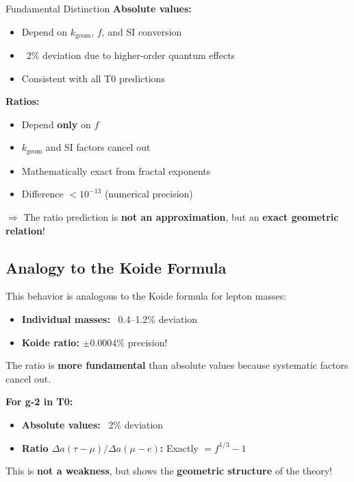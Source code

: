 	\begin{important}{Fundamental Distinction}
		\textbf{Absolute values:}
		\begin{itemize}
			\item Depend on $k_{\text{geom}}$, $f$, and SI conversion
			\item ~2\% deviation due to higher-order quantum effects
			\item Consistent with all T0 predictions
		\end{itemize}
		
		\textbf{Ratios:}
		\begin{itemize}
			\item Depend \textbf{only} on $f$
			\item $k_{\text{geom}}$ and SI factors cancel out
			\item Mathematically exact from fractal exponents
			\item Difference $< 10^{-13}$ (numerical precision)
		\end{itemize}
		
		$\Rightarrow$ The ratio prediction is \textbf{not an approximation}, but an \textbf{exact geometric relation}!
	\end{important}
	
	\subsection{Analogy to the Koide Formula}
	
	This behavior is analogous to the Koide formula for lepton masses:
	
	\begin{itemize}
		\item \textbf{Individual masses:} ~0.4--1.2\% deviation
		\item \textbf{Koide ratio:} $\pm 0.0004\%$ precision!
	\end{itemize}
	
	The ratio is \textbf{more fundamental} than absolute values because systematic factors cancel out.
	
	\textbf{For g-2 in T0:}
	\begin{itemize}
		\item \textbf{Absolute values:} ~2\% deviation
		\item \textbf{Ratio $\Delta a(\tau-\mu)/\Delta a(\mu-e)$:} Exactly $= f^{1/3} - 1$
	\end{itemize}
	
	This is \textbf{not a weakness}, but shows the \textbf{geometric structure} of the theory!
	
